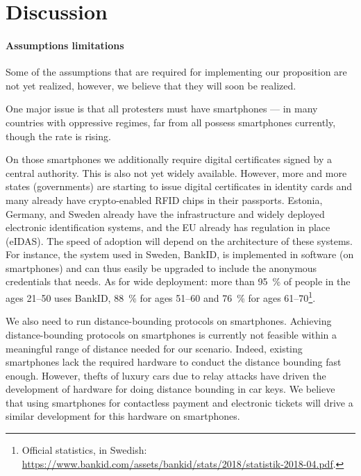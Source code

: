 \section{Discussion}%
\label{Discussion}

\paragraph*{Assumptions limitations} 

Some of the assumptions that are required for implementing our proposition are 
not yet realized, however, we believe that they will soon be realized.

One major issue is that all protesters must have smartphones --- in many 
countries with oppressive regimes, far from all possess smartphones
currently, though the rate is rising.

On those smartphones we additionally require digital certificates signed by a 
central authority.
This is also not yet widely available.
However, more and more states (governments) are starting to issue digital 
certificates in identity cards and many already have crypto-enabled RFID chips 
in their passports.
\Eg Estonia, Germany, and Sweden already have the infrastructure and widely 
deployed electronic identification systems, and the EU already has regulation 
in place (eIDAS).
The speed of adoption will depend on the architecture of these systems.
For instance, the system used in Sweden, BankID, is implemented in software (on 
smartphones) and can thus easily be upgraded to include the anonymous 
credentials that \CROCUS needs.
As for wide deployment: more than \SI{95}{\%} of people in the ages 21--50 uses 
BankID, \SI{88}{\%} for ages 51--60 and \SI{76}{\%} for ages 
61--70\footnote{%
  Official statistics, in Swedish:  
  \url{https://www.bankid.com/assets/bankid/stats/2018/statistik-2018-04.pdf}.
}.

We also need to run distance-bounding protocols on smartphones.
Achieving distance-bounding protocols on smartphones is currently not feasible 
within a meaningful range of distance needed for our scenario.
Indeed, existing smartphones lack the required hardware to conduct the distance bounding fast enough.
However, thefts of luxury cars due to relay attacks have driven the development 
of hardware for doing distance bounding in car keys.
We believe that using smartphones for contactless payment and electronic 
tickets will drive a similar development for this hardware on smartphones.

